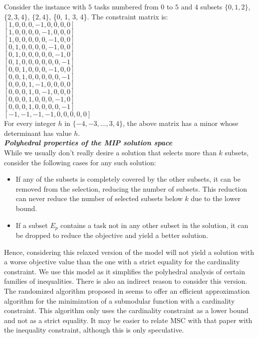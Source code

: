 \documentclass[12pt]{article}
\newcommand{\subheading}[1]{\emph{\textbf{#1}}}
\begin{document}
Consider the instance with $5$ tasks numbered from $0$ to $5$ and $4$ subsets $\{0, 1, 2\}$, $\{2, 3, 4\}$, $\{2, 4\}$, \{0, 1, 3, 4\}. The constraint matrix is:\\

$[1, 0, 0, 0, -1, 0, 0, 0, 0]$\\
$[1, 0, 0, 0, 0, -1, 0, 0, 0]$\\
$[1, 0, 0, 0, 0, 0, -1, 0, 0]$\\
$[0, 1, 0, 0, 0, 0, -1, 0, 0]$\\
$[0, 1, 0, 0, 0, 0, 0, -1, 0]$\\
$[0, 1, 0, 0, 0, 0, 0, 0, -1]$\\
$[0, 0, 1, 0, 0, 0, -1, 0, 0]$\\
$[0, 0, 1, 0, 0, 0, 0, 0, -1]$\\
$[0, 0, 0, 1, -1, 0, 0, 0, 0]$\\
$[0, 0, 0, 1, 0, -1, 0, 0, 0]$\\
$[0, 0, 0, 1, 0, 0, 0, -1, 0]$\\
$[0, 0, 0, 1, 0, 0, 0, 0, -1]$\\
$[-1, -1, -1, -1, 0, 0, 0, 0, 0]$\\

For every integer $h$ in $\{-4, -3, ..., 3, 4\}$, the above matrix has a minor whose determinant has value $h$.\\

\subheading{Polyhedral properties of the MIP solution space}\\

While we usually don't really desire a solution that selects more than $k$ subsets, consider the following cases for any such solution:

\begin{itemize}
\item If any of the subsets is completely covered by the other subsets, it can be removed from the selection, reducing the number of subsets. This reduction can never reduce the number of selected subsets below $k$ due to the lower bound.
\item If a subset $E_p$ contains a task not in any other subset in the solution, it can be dropped to reduce the objective and yield a better solution.
\end{itemize}

Hence, considering this relaxed version of the model will not yield a solution with a worse objective value than the one with a strict equality for the cardinality constraint. We use this model as it simplifies the polyhedral analysis of certain families of inequalities. There is also an indirect reason to consider this version. The randomized algorithm proposed in \cite{SvitkinaFleischer2011} seems to offer an efficient approximation algorithm for the minimization of a submodular function with a cardinality constraint. This algorithm only uses the cardinality constraint as a lower bound and not as a strict equality. It may be easier to relate MSC with that paper with the inequality constraint, although this is only speculative.\\
\end{document}
